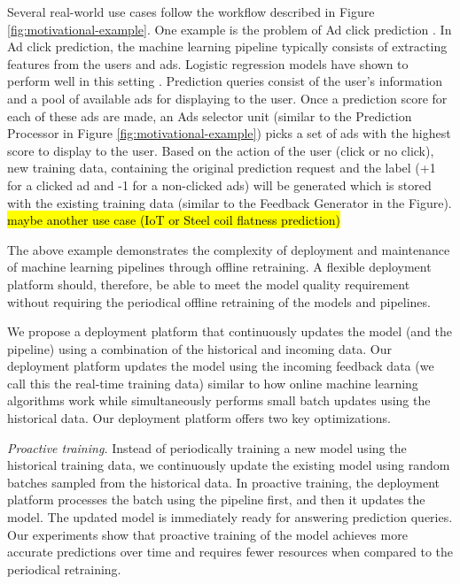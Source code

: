 Several real-world use cases follow the workflow described in Figure \ref{fig:motivational-example}.
One example is the problem of Ad click prediction \cite{macmahan2013}.
In Ad click prediction, the machine learning pipeline typically consists of extracting features from the users and ads. 
Logistic regression models have shown to perform well in this setting \cite{macmahan2013}.
Prediction queries consist of the user's information and a pool of available ads for displaying to the user.
Once a prediction score for each of these ads are made, an Ads selector unit (similar to the Prediction Processor in Figure \ref{fig:motivational-example}) picks a set of ads with the highest score to display to the user.
Based on the action of the user (click or no click), new training data, containing the original prediction request and the label (+1 for a clicked ad and -1 for a non-clicked ads) will be generated which is stored with the existing training data (similar to the Feedback Generator in the Figure).
\hl{maybe another use case (IoT or Steel coil flatness prediction)}

The above example demonstrates the complexity of deployment and maintenance of machine learning pipelines through offline retraining.
A flexible deployment platform should, therefore, be able to meet the model quality requirement without requiring the periodical offline retraining of the models and pipelines.

We propose a deployment platform that continuously updates the model (and the pipeline) using a combination of the historical and incoming data.
Our deployment platform updates the model using the incoming feedback data (we call this the real-time training data) similar to how online machine learning algorithms work while simultaneously performs small batch updates using the historical data.
Our deployment platform offers two key optimizations.

\textit{Proactive training.}
Instead of periodically training a new model using the historical training data, we continuously update the existing model using random batches sampled from the historical data.
In proactive training, the deployment platform processes the batch using the pipeline first, and then it updates the model.
The updated model is immediately ready for answering prediction queries.
Our experiments show that proactive training of the model achieves more accurate predictions over time and requires fewer resources when compared to the periodical retraining.

